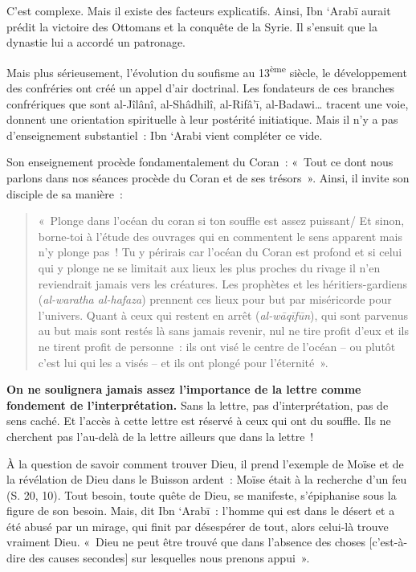 C'est complexe. Mais il existe des facteurs explicatifs. Ainsi, Ibn
`Arabī aurait prédit la victoire des Ottomans et la conquête de la
Syrie. Il s'ensuit que la dynastie lui a accordé un patronage.

Mais plus sérieusement, l'évolution du soufisme au
13\textsuperscript{ème} siècle, le développement des confréries ont créé
un appel d'air doctrinal. Les fondateurs de ces branches confrériques
que sont al-Jîlânî, al-Shâdhilî, al-Rifâ'ī, al-Badawi\ldots{} tracent
une voie, donnent une orientation spirituelle à leur postérité
initiatique. Mais il n'y a pas d'enseignement substantiel~: Ibn `Arabi
vient compléter ce vide.

Son enseignement procède fondamentalement du Coran~: «~Tout ce dont nous
parlons dans nos séances procède du Coran et de ses
trésors~». Ainsi, il invite son disciple
de sa manière~:
\begin{quote}
«~Plonge dans l'océan du coran si ton souffle est assez puissant/ Et
sinon, borne-toi à l'étude des ouvrages qui en commentent le sens
apparent mais n'y plonge pas~! Tu y périrais car l'océan du Coran est
profond et si celui qui y plonge ne se limitait aux lieux les plus
proches du rivage il n'en reviendrait jamais vers les créatures. Les
prophètes et les héritiers-gardiens (\emph{al-waratha al-hafaza})
prennent ces lieux pour but par miséricorde pour l'univers. Quant à ceux
qui restent en arrêt (\emph{al-wāqīfūn}), qui sont parvenus au but mais
sont restés là sans jamais revenir, nul ne tire profit d'eux et ils ne
tirent profit de personne~: ils ont visé le centre de l'océan -- ou
plutôt c'est lui qui les a visés -- et ils ont plongé pour
l'éternité~».
    
\end{quote}

\textbf{On ne soulignera jamais assez l'importance de la lettre comme fondement
de l'interprétation.} Sans la lettre, pas d'interprétation, pas de sens
caché. Et l'accès à cette lettre est réservé à ceux qui ont du souffle.
Ils ne cherchent pas l'au-delà de la lettre ailleurs que dans la
lettre~!

À la question de savoir comment trouver Dieu, il prend l'exemple de
Moïse et de la révélation de Dieu dans le Buisson ardent~: Moïse était à
la recherche d'un feu (S. 20, 10). Tout besoin, toute quête de Dieu, se
manifeste, s'épiphanise sous la figure de son besoin. Mais, dit Ibn
`Arabī~: l'homme qui est dans le désert et a été abusé par un mirage,
qui finit par désespérer de tout, alors celui-là trouve vraiment
Dieu. «~Dieu ne peut être trouvé que dans
l'absence des choses {[}c'est-à-dire des causes secondes{]} sur
lesquelles nous prenons appui~».

